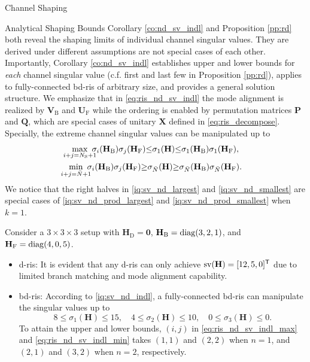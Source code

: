 \documentclass[journal]{IEEEtran}
\begin{document}
\begin{section}{Channel Shaping}
\begin{subsection}{Analytical Shaping Bounds}
		Corollary \ref{co:nd_sv_indl} and Proposition \ref{pp:rd} both reveal the shaping limits of individual channel singular values.
		They are derived under different assumptions are not special cases of each other.
		Importantly, Corollary \ref{co:nd_sv_indl} establishes upper and lower bounds for \emph{each} channel singular value (c.f. first and last few in Proposition \ref{pp:rd}), applies to fully-connected \gls{bd}-\gls{ris} of arbitrary size, and provides a general solution structure.
		We emphasize that in \eqref{eq:ris_nd_sv_indl} the mode alignment is realized by $\mathbf{V}_\mathrm{B}$ and $\mathbf{U}_\mathrm{F}$ while the ordering is enabled by permutation matrices $\mathbf{P}$ and $\mathbf{Q}$, which are special cases of unitary $\mathbf{X}$ defined in \eqref{eq:ris_decompose}.
		Specially, the extreme channel singular values can be manipulated up to
		\begin{subequations}
			\label{iq:sv_nd_extreme}
			\begin{gather}
				\max_{\mathclap{i+j=N_\mathrm{S}+1}} \ \sigma_i(\mathbf{H}_\mathrm{B}) \sigma_j(\mathbf{H}_\mathrm{F}) {\le} \sigma_1(\mathbf{H}) {\le} \sigma_1(\mathbf{H}_\mathrm{B}) \sigma_1(\mathbf{H}_\mathrm{F}), \label{iq:sv_nd_largest} \\
				\min_{\mathclap{i+j=\bar{N}+1}} \ \sigma_i(\mathbf{H}_\mathrm{B}) \sigma_j(\mathbf{H}_\mathrm{F}) {\ge} \sigma_{\bar{N}}(\mathbf{H}) {\ge} \sigma_{\bar{N}}(\mathbf{H}_\mathrm{B}) \sigma_{\bar{N}}(\mathbf{H}_\mathrm{F}). \label{iq:sv_nd_smallest}
			\end{gather}
		\end{subequations}
		We notice that the right halves in \eqref{iq:sv_nd_largest} and \eqref{iq:sv_nd_smallest} are special cases of \eqref{iq:sv_nd_prod_largest} and \eqref{iq:sv_nd_prod_smallest} when $k=1$.

		\begin{example}
			\label{eg:shaping_bounds}
			Consider a $3 \times 3 \times 3$ setup with $\mathbf{H}_\mathrm{D} = \mathbf{0}$, $\mathbf{H}_\mathrm{B} = \operatorname{diag}(3, 2, 1)$, and $\mathbf{H}_\mathrm{F} = \operatorname{diag}(4, 0, 5)$.
			\begin{itemize}
				\item \gls{d}-\gls{ris}: It is evident that any \gls{d}-\gls{ris} can only achieve $\operatorname{sv}(\mathbf{H}) = [12, 5, 0]^\mathsf{T}$ due to limited branch matching and mode alignment capability.
				\item \gls{bd}-\gls{ris}: According to \eqref{iq:sv_nd_indl}, a fully-connected \gls{bd}-\gls{ris} can manipulate the singular values up to
					\begin{equation*}
						8 \le \sigma_1(\mathbf{H}) \le 15, \quad 4 \le \sigma_2(\mathbf{H}) \le 10, \quad 0 \le \sigma_3(\mathbf{H}) \le 0.
					\end{equation*}
					To attain the upper and lower bounds, $(i,j)$ in \eqref{eq:ris_nd_sv_indl_max} and \eqref{eq:ris_nd_sv_indl_min} takes $(1, 1)$ and $(2, 2)$ when $n=1$, and $(2, 1)$ and $(3, 2)$ when $n=2$, respectively.
			\end{itemize}
		\end{example}


\end{subsection}
\end{section}
\end{document}
